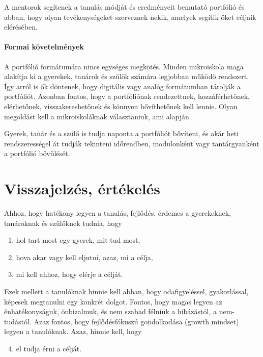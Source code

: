 A mentorok segítenek a tanulás módját és eredményeit bemutató portfólió és abban, hogy olyan tevékenységeket szerveznek nekik, amelyek segítik őket céljaik elérésében.

\paragraph{Formai követelmények}
A portfólió formátumára nincs egységes megkötés. Minden mikroiskola maga alakítja ki a gyerekek, tanárok és szülők számára legjobban működő rendszert. Így arról is ők döntenek, hogy digitális vagy analóg formátumban tárolják a portfóliót. Azonban fontos, hogy a portfóliónak rendezettnek, hozzáférhetőnek, elérhetőnek, visszakereshetőnek és könnyen bővíthetőnek kell lennie. Olyan megoldást kell a mikroiskoláknak választaniuk, ami alapján

Gyerek, tanár és a szülő is tudja naponta a portfóliót bővíteni, és akár heti rendszerességel át tudják tekinteni időrendben, modulonként vagy tantárgyanként a portfólió bövülését.

\section{Visszajelzés, értékelés}
\label{sec:ertekeles}
Ahhoz, hogy hatékony legyen a tanulás, fejlődés, érdemes a gyerekeknek, tanároknak és szülőknek tudnia, hogy
\begin{enumerate}
\item hol tart most egy gyerek, mit tud most,
\item hova akar vagy kell eljutni, azaz, mi a célja,
\item mi kell ahhoz, hogy elérje a célját.
\end{enumerate}
Ezek mellett a tanulóknak hinnie kell abban, hogy odafigyeléssel, gyakorlással, képesek megtanulni egy konkrét dolgot. Fontos, hogy magas legyen az énhatékonyságuk, önbizalmuk, és nem szabad félniük a hibázástól, a nem-tudástól. Azaz fontos, hogy fejlődésfókuszú gondolkodása (growth mindset)\cite{growthmindset} legyen a tanulóknak. Azaz, hinnie kell, hogy
\begin{enumerate}
  \setcounter{enumi}{3}
  \item el tudja érni a célját.
\end{enumerate}

